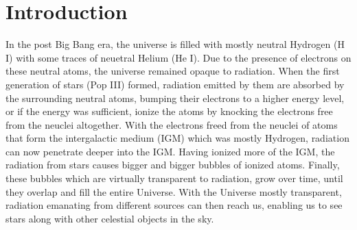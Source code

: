 
\section{Introduction}
\label{sec:introduction}

In the post Big Bang era, the universe is filled with mostly neutral Hydrogen (H {\footnotesize I}) with some traces of neuetral Helium (He {\footnotesize I}).  Due to the presence of electrons on these neutral atoms, the universe remained opaque to radiation.  When the first generation of stars (Pop {\footnotesize III}) formed, radiation emitted by them are absorbed by the surrounding neutral atoms, bumping their electrons to a higher energy level, or if the energy was sufficient, ionize the atoms by knocking the electrons free from the neuclei altogether.  With the electrons freed from the neuclei of atoms that form the intergalactic medium (IGM) which was mostly Hydrogen, radiation can now penetrate deeper into the IGM. Having ionized more of the IGM, the radiation from stars causes bigger and bigger bubbles of ionized atoms.  Finally, these bubbles which are virtually transparent to radiation, grow over time, until they overlap and fill the entire Universe.  With the Universe mostly transparent, radiation emanating from different sources can then reach us, enabling us to see stars along with other celestial objects in the sky.

